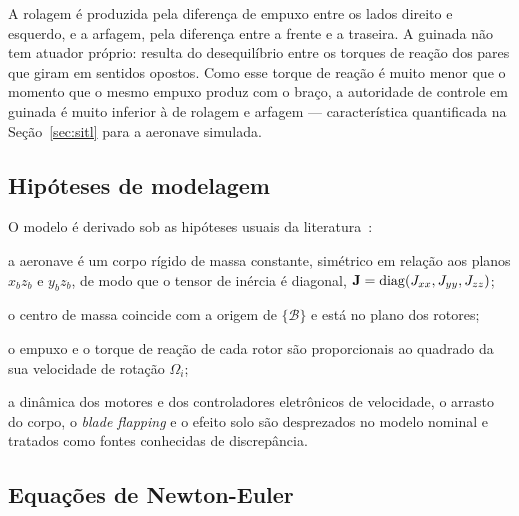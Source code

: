 A rolagem é produzida pela diferença de empuxo entre os lados direito e
esquerdo, e a arfagem, pela diferença entre a frente e a traseira. A guinada
não tem atuador próprio: resulta do desequilíbrio entre os torques de reação
dos pares que giram em sentidos opostos. Como esse torque de reação é muito
menor que o momento que o mesmo empuxo produz com o braço, a autoridade de
controle em guinada é muito inferior à de rolagem e arfagem --- característica
quantificada na Seção~\ref{sec:sitl} para a aeronave simulada.

\subsection{Hipóteses de modelagem}

O modelo é derivado sob as hipóteses usuais da
literatura~\cite{bouabdallah2007,beard2008,sabatino2015}:
\begin{alineas}
    \item a aeronave é um corpo rígido de massa constante, simétrico em relação
          aos planos $x_b z_b$ e $y_b z_b$, de modo que o tensor de inércia é
          diagonal, $\mathbf{J} = \operatorname{diag}(J_{xx}, J_{yy}, J_{zz})$;
    \item o centro de massa coincide com a origem de $\{\mathcal{B}\}$ e está
          no plano dos rotores;
    \item o empuxo e o torque de reação de cada rotor são proporcionais ao
          quadrado da sua velocidade de rotação $\Omega_i$;
    \item a dinâmica dos motores e dos controladores eletrônicos de
          velocidade, o arrasto do corpo, o \textit{blade flapping} e o efeito
          solo são desprezados no modelo nominal e tratados como fontes
          conhecidas de discrepância.
\end{alineas}

\subsection{Equações de Newton-Euler}

